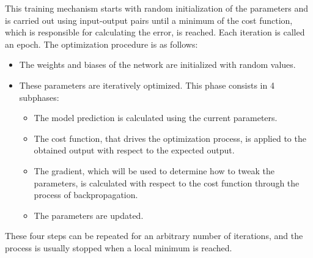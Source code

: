 This training mechanism starts with random initialization of the parameters and is carried out using input-output pairs until a minimum of the cost function, which is responsible for calculating the error, is reached. Each iteration is called an epoch.
The optimization procedure is as follows:
\begin{itemize}
    \item The weights and biases of the network are initialized with random values.
    \item These parameters are iteratively optimized. This phase consists in 4 subphases:
    \begin{itemize}
        \item The model prediction is calculated using the current parameters.
        \item The cost function, that drives the optimization process, is applied to the obtained output with respect to the expected output.
        \item The gradient, which will be used to determine how to tweak the parameters, is calculated with respect to the cost function through the process of backpropagation.
        \item The parameters are updated. 
    \end{itemize}
\end{itemize}

These four steps can be repeated for an arbitrary number of iterations, and the process is usually stopped when a local minimum is reached.
\clearpage 
